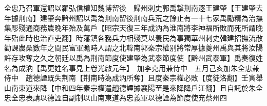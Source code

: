 全忠乃召軍還詔以羅弘信權知魏博留後　歸州刺史郭禹撃荆南逐王建肇【王建肇去年據荆南】建肇奔黔州詔以禹為荆南留後荆南兵荒之餘止有一十七家禹勵精為治撫集彫殘通商務農晚年殆及萬戶【昭宗天復三年成汭為淮南將李神福所敗而死所謂晚年殆此時也治直吏翻】時藩鎮各務兵力相殘莫以養民為事獨華州刺史韓建招撫流散勸課農桑數年之間民富軍贍時人謂之北韓南郭秦宗權别將常厚據夔州禹與其將汝陽許存攻奪之久之朝廷以禹為荆南節度使建肇為武泰節度使【黔州武泰軍】禹奏復姓名為成汭【禹更姓名事見上卷光啟元年】　加李克用兼侍中　五月己亥加朱全忠兼侍中　趙德諲既失荆南【荆南時為成汭所奪】且度秦宗權必敗【度徒洛翻】壬寅舉山南東道來降【中和四年秦宗權遣趙德諲據襄陽至是來降降戶江翻】且自託於朱全忠全忠表請以德諲自副制以山南東道為忠義軍以德諲為節度使充蔡州四